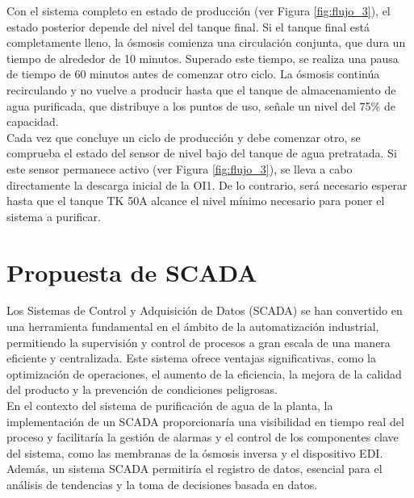 Con el sistema completo en estado de producción (ver Figura \ref{fig:flujo_3}), el estado
posterior depende del nivel del tanque final. Si el tanque final está
completamente lleno, la ósmosis comienza una circulación conjunta, que dura un
tiempo de alrededor de 10 minutos. Superado este tiempo, se realiza una pausa de tiempo de 60 minutos antes de
comenzar otro ciclo. La ósmosis continúa recirculando y no vuelve a producir
hasta que el tanque de almacenamiento de agua purificada, que distribuye a los
puntos de uso, señale un nivel del 75\% de capacidad.\\

Cada vez que concluye un ciclo de producción y debe comenzar otro, se comprueba
el estado del sensor de nivel bajo del tanque de agua pretratada. Si este
sensor permanece activo (ver Figura \ref{fig:flujo_3}), se lleva a cabo directamente la
descarga inicial de la OI1. De lo contrario, será necesario esperar hasta que
el tanque TK 50A alcance el nivel mínimo necesario para poner el sistema a purificar.\\




\section{Propuesta de SCADA}
\label{sec:scada_proposal}

Los Sistemas de Control y Adquisición de Datos (SCADA) se han convertido en una herramienta fundamental en el ámbito de la automatización industrial, permitiendo la supervisión y control de procesos a gran escala de una manera eficiente y centralizada. Este sistema ofrece ventajas significativas, como la optimización de operaciones, el aumento de la eficiencia, la mejora de la calidad del producto y la prevención de condiciones peligrosas.\\

En el contexto del sistema de purificación de agua de la planta, la implementación de un SCADA proporcionaría una visibilidad en tiempo real del proceso y facilitaría la gestión de alarmas y el control de los componentes clave del sistema, como las membranas de la ósmosis inversa y el dispositivo EDI. Además, un sistema SCADA permitiría el registro de datos, esencial para el análisis de tendencias y la toma de decisiones basada en datos.\\

